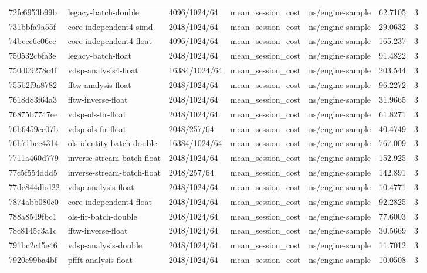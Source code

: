 \begin{longtable}{lllllrr}
72fc6953b99b & legacy-batch-double & 4096/1024/64 & mean\_session\_cost & ns/engine-sample & 62.7105 & 3 \\
731bbfa9a55f & core-independent4-simd & 2048/1024/64 & mean\_session\_cost & ns/engine-sample & 29.0632 & 3 \\
74bcec6c06cc & core-independent4-float & 4096/1024/64 & mean\_session\_cost & ns/engine-sample & 165.237 & 3 \\
750532cbfa3e & legacy-batch-float & 2048/1024/64 & mean\_session\_cost & ns/engine-sample & 91.4822 & 3 \\
750d09278c4f & vdsp-analysis4-float & 16384/1024/64 & mean\_session\_cost & ns/engine-sample & 203.544 & 3 \\
755b2f9a8782 & fftw-analysis-float & 2048/1024/64 & mean\_session\_cost & ns/engine-sample & 96.2272 & 3 \\
7618d83f64a3 & fftw-inverse-float & 2048/1024/64 & mean\_session\_cost & ns/engine-sample & 31.9665 & 3 \\
76875b7747ee & vdsp-ols-fir-float & 2048/1024/64 & mean\_session\_cost & ns/engine-sample & 61.8271 & 3 \\
76b6459ee07b & vdsp-ols-fir-float & 2048/257/64 & mean\_session\_cost & ns/engine-sample & 40.4749 & 3 \\
76b71bec4314 & ols-identity-batch-double & 16384/1024/64 & mean\_session\_cost & ns/engine-sample & 767.009 & 3 \\
7711a460d779 & inverse-stream-batch-float & 2048/1024/64 & mean\_session\_cost & ns/engine-sample & 152.925 & 3 \\
77c5f554ddd5 & inverse-stream-batch-float & 2048/257/64 & mean\_session\_cost & ns/engine-sample & 142.891 & 3 \\
77de844dbd22 & vdsp-analysis-float & 2048/1024/64 & mean\_session\_cost & ns/engine-sample & 10.4771 & 3 \\
7874abb080c0 & core-independent4-float & 2048/1024/64 & mean\_session\_cost & ns/engine-sample & 92.2825 & 3 \\
788a8549fbc1 & ols-fir-batch-double & 2048/1024/64 & mean\_session\_cost & ns/engine-sample & 77.6003 & 3 \\
78c8145c3a1c & fftw-inverse-float & 2048/1024/64 & mean\_session\_cost & ns/engine-sample & 30.5669 & 3 \\
791bc2c45e46 & vdsp-analysis-double & 2048/1024/64 & mean\_session\_cost & ns/engine-sample & 11.7012 & 3 \\
7920e99ba4bf & pffft-analysis-float & 2048/1024/64 & mean\_session\_cost & ns/engine-sample & 10.0508 & 3 \\

\end{longtable}
